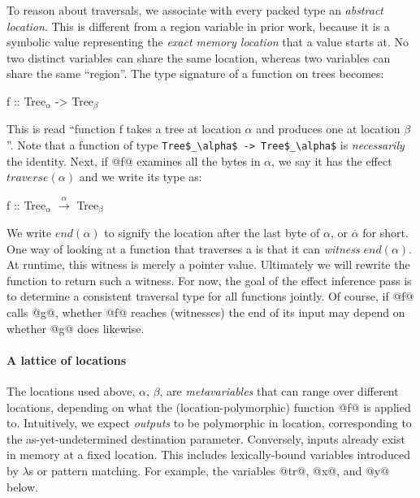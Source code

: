 \documentclass[a4paper,english]{lipics-v2016}
\newcommand{\travarr}[1]{\xrightarrow{#1}}
\newcommand{\arr}[3]{\ensuremath{{#1} \travarr{#2} {#3}}}
\newcommand{\fresh}[1]{\ensuremath{#1}}
\newcommand{\freshA}{\fresh{\alpha}}
\newcommand{\freshB}{\fresh{\beta}}
\newcommand{\locend}[1]{\ensuremath{\overline{#1}}}
\begin{document}
To reason about traversals, we associate with every packed type an {\em abstract
  location}. This is different from a region variable in prior work, because it
is a symbolic value representing the {\em exact memory location} that a value starts
at.  No two distinct variables can share the same location, whereas two
variables can share the same ``region''.  The type signature of a function on
trees becomes:

\begin{code}
f :: Tree$_\alpha$ -> Tree$_\beta$
\end{code}

This is read ``function f takes a tree at location $\alpha$ and produces one at
location $\beta$''.
Note that a function of type \lstinline{Tree$_\alpha$ -> Tree$_\alpha$} is {\em necessarily} the identity.
%
Next, if @f@ examines all the bytes in $\alpha$, we say it has the effect $traverse(\alpha)$
and we write its type as:

\begin{code}
f :: Tree$_\freshA$ $\travarr{\freshA}$ Tree$_\freshB$
\end{code}


We write $end(\freshA)$ to signify the location after the last byte of \freshA,
or \locend{\freshA} for short.  One way of looking at a function that traverses
a is that it can {\em witness} $end(\freshA)$.  At runtime, this witness is
merely a pointer value.
%
Ultimately we will rewrite the function to return such a witness.  For now, the
goal of the effect inference pass is to determine a consistent traversal type for all
functions jointly.
%
Of course, if @f@ calls @g@, whether @f@ reaches (witnesses) the end of its
input may depend on whether @g@ does likewise.

\paragraph*{A lattice of locations}

The locations used above, \freshA, \freshB, are {\em metavariables} that can range
over different locations, depending on what the (location-polymorphic) function
@f@ is applied to.
%
Intuitively, we expect {\em outputs} to be polymorphic in location,
corresponding to the as-yet-undetermined destination parameter.  Conversely,
inputs already exist in memory at a fixed location.
%
This includes lexically-bound variables introduced by $\lambda$s or
pattern matching.
For example, the variables @tr@, @x@, and @y@ below.
\end{document}
